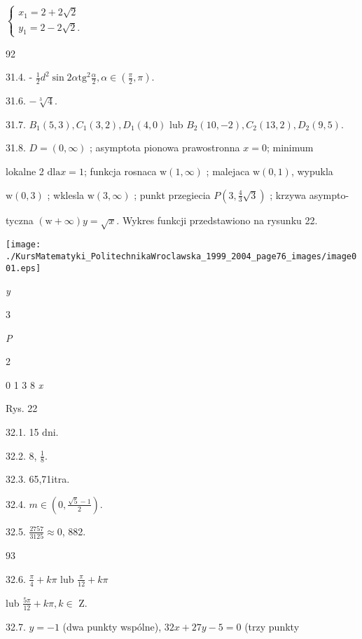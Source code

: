 \documentclass[a4paper,12pt]{article}
\begin{document}
$\left\{\begin{array}{l}
x_{1}=2+2\sqrt{2}\\
y_{1}=2-2\sqrt{2}.
\end{array}\right.$





92

31.4. - $\displaystyle \frac{1}{2}d^{2}\sin 2\alpha \mathrm{t}\mathrm{g}^{2}\frac{\alpha}{2}, \alpha\in (\displaystyle \frac{\pi}{2},\pi).$

31.6. $-\sqrt[3]{4}.$

31.7. $B_{1}(5,3), C_{1}(3,2), D_{1}(4,0)$ lub $B_{2}(10,-2), C_{2}(13,2), D_{2}(9,5).$

31.8. $D= (0,\infty)$ ; asymptota pionowa prawostronna $x=0$; minimum

lokalne 2 $\mathrm{d}\mathrm{l}\mathrm{a}x=1$; funkcja rosnaca $\mathrm{w}(1,\infty)$ ; malejaca $\mathrm{w} (0,1)$, wypukla

$\mathrm{w}(0,3)$ ; wklesla $\mathrm{w}(3,\infty)$ ; punkt przegiecia $P(3,\displaystyle \frac{4}{3}\sqrt{3})$ ; krzywa asympto-

tyczna $(\mathrm{w}+\infty) y=\sqrt{x}$. Wykres funkcji przedstawiono na rysunku 22.
\begin{center}
\texttt{[image: ./KursMatematyki\_PolitechnikaWroclawska\_1999\_2004\_page76\_images/image001.eps]}
\end{center}
{\it y}

3

{\it P}

2

0 1  3  8  {\it x}

Rys. 22

32.1. 15 $\mathrm{d}\mathrm{n}\mathrm{i}.$

32.2. 8, $\displaystyle \frac{1}{8}.$

32.3. 65,71itra.

32.4. $ m\in (0,\displaystyle \frac{\sqrt{5}-1}{2}).$

32.5. $\displaystyle \frac{2757}{3125}\approx 0$, 882.





93

32.6. $\displaystyle \frac{\pi}{4}+k\pi$ lub $\displaystyle \frac{\pi}{12}+k\pi$

lub $\displaystyle \frac{5\pi}{12}+k\pi,  k\in$ Z.

32.7. $y=-1$ (dwa punkty wspólne), $32x+27y-5=0$ (trzy punkty
\end{document}
